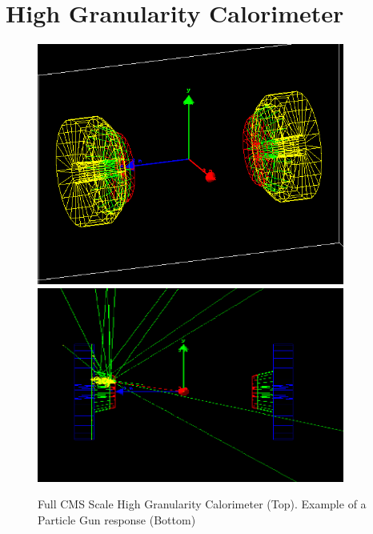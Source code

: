 \section{High Granularity Calorimeter} \label{section:simulations_hgc}

\begin{figure}[hbp]
    \centering
    \includegraphics[width=0.9\textwidth]{figures/ch_simulations/hgc/detetor_3d/HGC_70_20.png}
    \includegraphics[width=0.9\textwidth]{figures/ch_simulations/hgc/detetor_3d/HGCal_1Event_NoSides.png}
    \caption{Full CMS Scale High Granularity Calorimeter (Top). Example of a Particle Gun response (Bottom)}
    \label{fig:simulations_hgcexamples}
 \end{figure}


